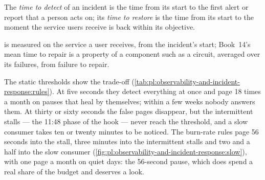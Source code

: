 \begin{definition}\label{def:pl:observability-and-incident-response:ttd}
The \emph{time to detect} of an incident is the time from its start to the first alert or report that a person acts on;
its \emph{time to restore} is the time from its start to the moment the service users receive is back within its
objective.
\end{definition}

 is measured on the service a user receives, from the incident's start; Book~14's mean time to repair is a property of a
component such as a circuit, averaged over its failures, from failure to repair.

The static thresholds show the trade-off (\cref{tab:pl:observability-and-incident-response:rules}). At five seconds they detect everything at
once and page 18 times a month on pauses that heal by themselves; within a few weeks nobody answers them. At thirty or sixty seconds the false
pages disappear, but the intermittent stalls --- the 11:48 phase of the hook --- never reach the threshold, and a slow consumer takes ten or
twenty minutes to be noticed. The burn-rate rules page 56 seconds into the stall, three minutes into the intermittent stalls and two and a half
into the slow consumer (\cref{fig:pl:observability-and-incident-response:slow}), with one page a month on quiet days: the 56-second pause, which
does spend a real share of the budget and deserves a look.

